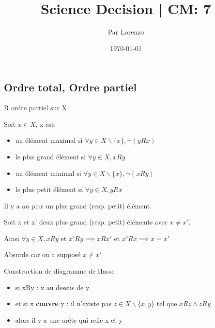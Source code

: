 \documentclass[a4paper, 12pt]{article}
\title{Science Decision | CM: 7}
\author{Par Lorenzo}
\date{\today}
\begin{document}
\maketitle

\subsection{Ordre total, Ordre partiel}

R ordre partiel sur X

Soit $x \in X$, x est:

\begin{itemize}
    \item un élément maximal si $\forall y \in X\backslash\{x\}, \neg (yRx)$
    \item le plus grand élément si $\forall y \in X, xRy$
    \item un élément minimal si $\forall y \in X\backslash\{x\}, \neg (xRy)$
    \item le plus petit élément si $\forall y \in X, yRx$
\end{itemize}

\begin{proposition}
    Il y a au plus un plus grand (resp. petit) élément.
\end{proposition}

\begin{demonstration}
    Soit x et x' deux plus grand (resp. petit) éléments avec $x \neq x'$.

    Ainsi $\forall y \in X, xRy \text{ et } x'Ry \implies xRx' \text{ et } x'Rx \implies x = x'$

    Absurde car on a supposé $x \neq x'$
\end{demonstration}

Construction de diagramme de Hasse
\begin{itemize}
    \item si xRy : x au dessus de y
    \item et si x \textbf{couvre} y : il n'existe pas $z \in X\backslash\{x, y\}$ tel que $xRz \land zRy$
    \item alors il y a une arête qui relie x et y
\end{itemize}
\end{document}

